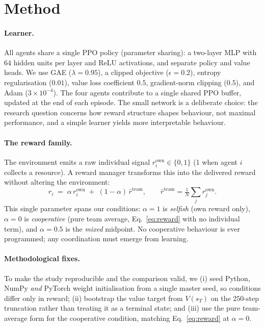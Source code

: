 \documentclass[sigconf,nonacm,anonymous,review]{acmart}
\begin{document}
\section{Method}
\label{sec:method}
\paragraph{Learner.} All agents share a single PPO policy (parameter sharing): a two-layer MLP
with $64$ hidden units per layer and ReLU activations, and separate policy and value heads.
We use GAE ($\lambda=0.95$), a clipped objective ($\epsilon=0.2$), entropy regularisation
($0.01$), value loss coefficient $0.5$, gradient-norm clipping ($0.5$), and Adam
($3\times10^{-4}$). The four agents contribute to a single shared PPO buffer, updated at the
end of each episode. The small network is a deliberate choice: the research question concerns
how reward structure shapes behaviour, not maximal performance, and a simple learner yields
more interpretable behaviour.

\paragraph{The reward family.} The environment emits a raw individual signal
$r_i^{\text{own}}\in\{0,1\}$ (1 when agent $i$ collects a resource). A reward manager
transforms this into the delivered reward without altering the environment:
\begin{equation}
  r_i \;=\; \alpha\, r_i^{\text{own}} \;+\; (1-\alpha)\,\bar r^{\text{team}},
  \qquad \bar r^{\text{team}} = \tfrac{1}{N}\textstyle\sum_j r_j^{\text{own}}.
  \label{eq:reward}
\end{equation}
This single parameter spans our conditions: $\alpha{=}1$ is \emph{selfish} (own reward only),
$\alpha{=}0$ is \emph{cooperative} (pure team average, Eq.~\eqref{eq:reward} with no individual
term), and $\alpha{=}0.5$ is the \emph{mixed} midpoint. No cooperative behaviour is ever
programmed; any coordination must emerge from learning.

\paragraph{Methodological fixes.} To make the study reproducible and the comparison valid, we
(i) seed Python, NumPy \emph{and} PyTorch weight initialisation from a single master seed, so
conditions differ only in reward; (ii) bootstrap the value target from $V(s_T)$ on the
$250$-step truncation rather than treating it as a terminal state; and (iii) use the pure
team-average form for the cooperative condition, matching Eq.~\eqref{eq:reward} at $\alpha{=}0$.
\end{document}
